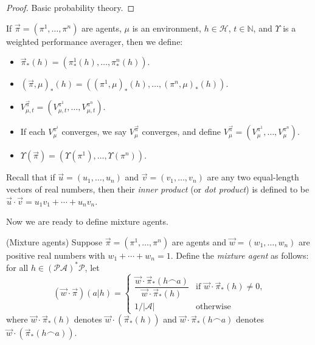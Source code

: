 \documentclass[runningheads]{llncs}
\begin{document}
\begin{proof}
    Basic probability theory.
\end{proof}

\begin{definition}
    If $\vec\pi=(\pi^1,\ldots,\pi^n)$ are agents, $\mu$ is an environment,
    $h\in\mathcal H$, $t\in\mathbb N$, and $\Upsilon$ is a weighted
    performance averager, then we define:
    \begin{itemize}
        \item $\vec\pi_*(h)=(\pi^1_*(h),\ldots,\pi^n_*(h))$.
        \item $(\vec\pi,\mu)_*(h)=((\pi^1,\mu)_*(h),\ldots,(\pi^n,\mu)_*(h))$.
        \item $V^{\vec\pi}_{\mu,t}=(V^{\pi^1}_{\mu,t},\ldots,V^{\pi^n}_{\mu,t})$.
        \item If each $V^{\pi^i}_\mu$ converges, we say $V^{\vec\pi}_\mu$
            converges, and define $V^{\vec\pi}_\mu=(V^{\pi^1}_\mu,\ldots,V^{\pi^n}_\mu)$.
        \item $\Upsilon(\vec\pi)=(\Upsilon(\pi^1),\ldots,\Upsilon(\pi^n))$.
    \end{itemize}
    Recall that if $\vec u=(u_1,\ldots,u_n)$ and
    $\vec v=(v_1,\ldots,v_n)$ are any two equal-length
    vectors of real numbers, then their \emph{inner product}
    (or \emph{dot product}) is defined to be
    $\vec u\cdot \vec v=u_1v_1+\cdots+u_nv_n$.
\end{definition}

Now we are ready to define mixture agents.

\begin{definition}
\label{maindefn}
    (Mixture agents)
    Suppose $\vec\pi=(\pi^1,\ldots,\pi^n)$ are agents and $\vec w=(w_1,\ldots,w_n)$
    are positive real numbers with $w_1+\cdots+w_n=1$.
    Define the \emph{mixture agent} as follows: for all
    $h\in (\mathcal P\mathcal A)^*\mathcal P$, let
    \[
        (\vec w\cdot\vec\pi)(a|h)
        =
        \begin{cases}
            \dfrac{\vec w\cdot \vec\pi_*(h\frown a)}{\vec w\cdot \vec\pi_*(h)}
            &\mbox{if $\vec w\cdot \vec\pi_*(h)\not=0$,}\\
            1/|\mathcal{A}| &\mbox{otherwise}
        \end{cases}
    \]
    where
    $\vec w\cdot \vec\pi_*(h)$ denotes $\vec w\cdot (\vec\pi_*(h))$
    and
    $\vec w\cdot\vec\pi_*(h\frown a)$ denotes
    $\vec w\cdot(\vec\pi_*(h\frown a))$.
\end{definition}
\end{document}
